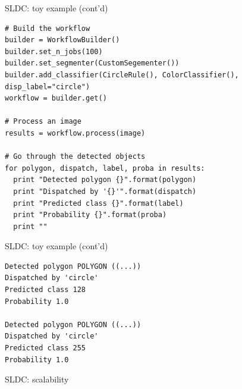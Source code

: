 \documentclass{beamer}
\begin{document}
\begin{frame}[fragile]{SLDC: toy example (cont'd)}
\begin{verbatim}
# Build the workflow
builder = WorkflowBuilder()
builder.set_n_jobs(100)
builder.set_segmenter(CustomSegementer())
builder.add_classifier(CircleRule(), ColorClassifier(), disp_label="circle")
workflow = builder.get()

# Process an image
results = workflow.process(image)

# Go through the detected objects
for polygon, dispatch, label, proba in results:
  print "Detected polygon {}".format(polygon)
  print "Dispatched by '{}'".format(dispatch)
  print "Predicted class {}".format(label)
  print "Probability {}".format(proba)
  print ""
\end{verbatim}
\end{frame}

\begin{frame}[fragile]{SLDC: toy example (cont'd)}
\begin{verbatim}
Detected polygon POLYGON ((...))
Dispatched by 'circle'
Predicted class 128
Probability 1.0

Detected polygon POLYGON ((...))
Dispatched by 'circle'
Predicted class 255
Probability 1.0
\end{verbatim}
\end{frame}


\begin{frame}[fragile]{SLDC: scalability}
\begin{figure}
	\center
	\hspace*{0.5cm}
\end{figure}
\end{frame}
\end{document}
